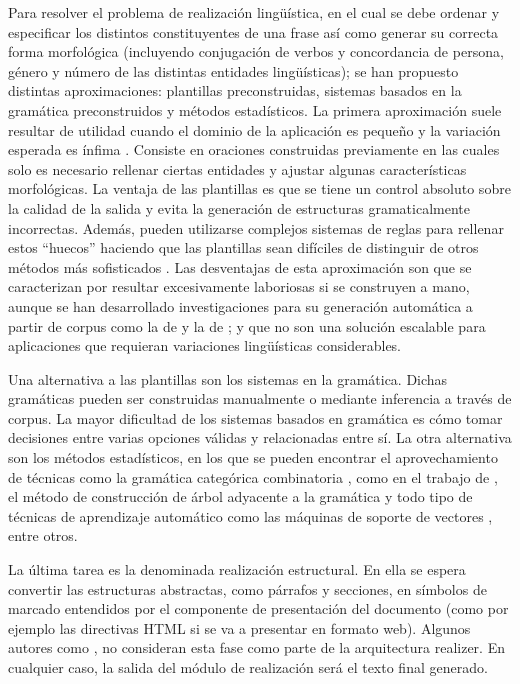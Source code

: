 Para resolver el problema de realización lingüística, en el cual se debe ordenar y especificar los distintos constituyentes de una frase así como generar su correcta forma morfológica (incluyendo conjugación de verbos y concordancia de persona, género y número de las distintas entidades lingüísticas); se han propuesto distintas aproximaciones: plantillas preconstruidas, sistemas basados en la gramática preconstruidos y métodos estadísticos. La primera aproximación suele resultar de utilidad cuando el dominio de la aplicación es pequeño y la variación esperada es ínfima \citep{mcroy2003augmented}. Consiste en oraciones construidas previamente en las cuales solo es necesario rellenar ciertas entidades y ajustar algunas características morfológicas. La ventaja de las plantillas es que se tiene un control absoluto sobre la calidad de la salida y evita la generación de estructuras gramaticalmente incorrectas. Además, pueden utilizarse complejos sistemas de reglas para rellenar estos ``huecos'' haciendo que las plantillas sean difíciles de distinguir de otros métodos más sofisticados \citep{deemter2005real}. Las desventajas de esta aproximación son que se caracterizan por resultar excesivamente laboriosas si se construyen a mano, aunque se han desarrollado investigaciones para su generación automática a partir de corpus como la de \cite{angeli2012parsing} y la de \cite{kondadadi2013statistical}; y que no son una solución escalable para aplicaciones que requieran variaciones lingüísticas considerables.

Una alternativa a las plantillas son los sistemas en la gramática. Dichas gramáticas pueden ser construidas manualmente \citep{elhadad1996overview} o mediante inferencia \citep{parekh2000grammar} a través de corpus. La mayor dificultad de los sistemas basados en gramática es cómo tomar decisiones entre varias opciones válidas y relacionadas entre sí. La otra alternativa son los métodos estadísticos, en los que se pueden encontrar el aprovechamiento de técnicas como la gramática categórica combinatoria \citep{steedman2000}, como en el trabajo de \cite{espinosa2008hypertagging}, el método de construcción de árbol adyacente a la gramática \citep{gardent2015multiple} y todo tipo de técnicas de aprendizaje automático como las máquinas de soporte de vectores \citep{bohnet2010broad}, entre otros.

La última tarea es la denominada realización estructural. En ella se espera convertir las estructuras abstractas, como párrafos y secciones, en símbolos de marcado entendidos por el componente de presentación del documento (como por ejemplo las directivas HTML si se va a presentar en formato web). Algunos autores como \cite{gatt2018survey}, no consideran esta fase como parte de la arquitectura realizer. En cualquier caso, la salida del módulo de realización será el texto final generado.

